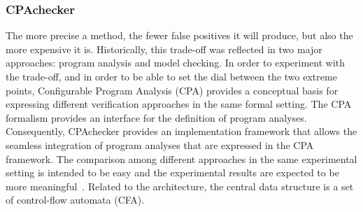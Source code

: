 \documentclass[10pt,conference]{IEEEtran}
\begin{document}
\subsubsection{CPAchecker}
The more precise a method, the fewer false positives it will produce, but also the more expensive it is.%
Historically, this trade-off was reflected in two major approaches: program analysis and model checking. In order to experiment with the trade-off, and in order to be able to set the dial between the two extreme points, Configurable Program Analysis (CPA) provides a conceptual basis for expressing different verification approaches in the same formal setting. The CPA formalism provides an interface for the definition of program analyses. Consequently, CPAchecker provides an implementation framework that allows the seamless integration of program analyses that are expressed in the CPA framework. The comparison among different approaches in the same experimental setting is intended to be easy and the experimental results are expected to be more meaningful~\cite{Beyer2011}. Related to the architecture, the central data structure is a set of control-flow automata (CFA). %

\end{document}
